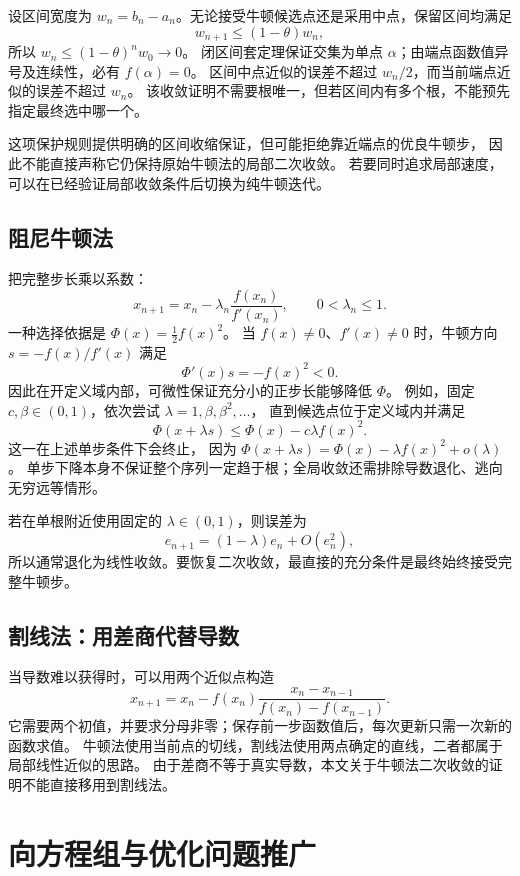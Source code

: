 \documentclass{ctexart}
\begin{document}
设区间宽度为 $w_n=b_n-a_n$。无论接受牛顿候选点还是采用中点，保留区间均满足
\[
  w_{n+1}\le(1-\theta)w_n,
\]
所以 $w_n\le(1-\theta)^n w_0\to0$。
闭区间套定理保证交集为单点 $\alpha$；由端点函数值异号及连续性，必有 $f(\alpha)=0$。
区间中点近似的误差不超过 $w_n/2$，而当前端点近似的误差不超过 $w_n$。
该收敛证明不需要根唯一，但若区间内有多个根，不能预先指定最终选中哪一个。

这项保护规则提供明确的区间收缩保证，但可能拒绝靠近端点的优良牛顿步，
因此不能直接声称它仍保持原始牛顿法的局部二次收敛。
若要同时追求局部速度，可以在已经验证局部收敛条件后切换为纯牛顿迭代。

\subsection{阻尼牛顿法}

把完整步长乘以系数：
\[
  x_{n+1}=x_n-\lambda_n\frac{f(x_n)}{f'(x_n)},\qquad0<\lambda_n\le1.
\]
一种选择依据是 $\Phi(x)=\frac12f(x)^2$。
当 $f(x)\ne0$、$f'(x)\ne0$ 时，牛顿方向 $s=-f(x)/f'(x)$ 满足
\[
  \Phi'(x)s=-f(x)^2<0.
\]
因此在开定义域内部，可微性保证充分小的正步长能够降低 $\Phi$。
例如，固定 $c,\beta\in(0,1)$，依次尝试 $\lambda=1,\beta,\beta^2,\ldots$，
直到候选点位于定义域内并满足
\[
  \Phi(x+\lambda s)\le\Phi(x)-c\lambda f(x)^2.
\]
这一在上述单步条件下会终止，
因为 $\Phi(x+\lambda s)=\Phi(x)-\lambda f(x)^2+o(\lambda)$。
单步下降本身不保证整个序列一定趋于根；全局收敛还需排除导数退化、逃向无穷远等情形。

若在单根附近使用固定的 $\lambda\in(0,1)$，则误差为
\[
  e_{n+1}=(1-\lambda)e_n+O(e_n^2),
\]
所以通常退化为线性收敛。要恢复二次收敛，最直接的充分条件是最终始终接受完整牛顿步。

\subsection{割线法：用差商代替导数}

当导数难以获得时，可以用两个近似点构造
\[
  x_{n+1}=x_n-
  f(x_n)\frac{x_n-x_{n-1}}{f(x_n)-f(x_{n-1})}.
\]
它需要两个初值，并要求分母非零；保存前一步函数值后，每次更新只需一次新的函数求值。
牛顿法使用当前点的切线，割线法使用两点确定的直线，二者都属于局部线性近似的思路。
由于差商不等于真实导数，本文关于牛顿法二次收敛的证明不能直接移用到割线法。

\section{向方程组与优化问题推广}
\label{sec:newton-extensions}
\end{document}
